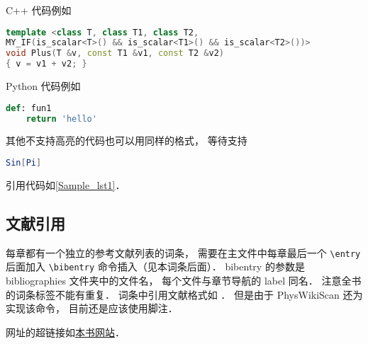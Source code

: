 C++ 代码例如
\begin{lstlisting}[language=cpp]
template <class T, class T1, class T2,
MY_IF(is_scalar<T>() && is_scalar<T1>() && is_scalar<T2>())>
void Plus(T &v, const T1 &v1, const T2 &v2)
{ v = v1 + v2; }
\end{lstlisting}

Python 代码例如
\begin{lstlisting}[language=python]
def: fun1
	return 'hello'
\end{lstlisting}

其他不支持高亮的代码也可以用同样的格式， 等待支持
\begin{lstlisting}[language=mathematica]
Sin[Pi]
\end{lstlisting}

引用代码如\autoref{Sample_lst1}．

\subsection{文献引用}
每章都有一个独立的参考文献列表的词条， 需要在主文件中每章最后一个 \verb|\entry| 后面加入 \verb|\bibentry| 命令插入（见本词条后面）． bibentry 的参数是 bibliographies 文件夹中的文件名， 每个文件与章节导航的 label 同名． 注意全书的词条标签不能有重复． 词条中引用文献格式如 \cite{PhysWiki} \cite{PhysWikiEng}． 但是由于 PhysWikiScan 还为实现该命令， 目前还是应该使用脚注．

网址的超链接如\href{http://wuli.wiki}{本书网站}．
